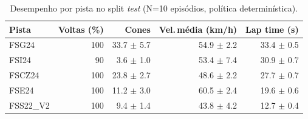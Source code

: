 \begin{table}[H]
\centering
\caption{Desempenho por pista no split \textit{test} (N=10 episódios, política determinística).}
\label{tab:per_track_test}
\begin{tabular}{lrrrr}
\toprule
\textbf{Pista} & \textbf{Voltas (\%)} & \textbf{Cones} & \textbf{Vel.\,m\'edia (km/h)} & \textbf{Lap time (s)} \\
\midrule
FSG24 & 100 & 33.7 $\pm$ 5.7 & 54.9 $\pm$ 2.2 & 33.4 $\pm$ 0.5 \\
FSI24 & 90 & 3.6 $\pm$ 1.0 & 53.4 $\pm$ 7.4 & 30.9 $\pm$ 0.7 \\
FSCZ24 & 100 & 23.8 $\pm$ 2.7 & 48.6 $\pm$ 2.2 & 27.7 $\pm$ 0.7 \\
FSE24 & 100 & 11.2 $\pm$ 3.0 & 60.5 $\pm$ 2.4 & 19.6 $\pm$ 0.6 \\
FSS22_V2 & 100 & 9.4 $\pm$ 1.4 & 43.8 $\pm$ 4.2 & 12.7 $\pm$ 0.4 \\
\bottomrule
\end{tabular}
\end{table}
